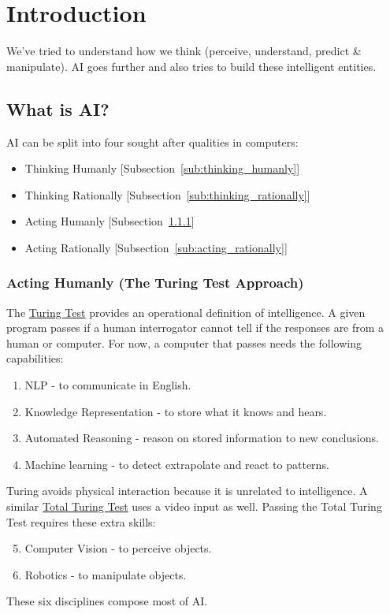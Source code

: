 \chapter{Introduction} %
\label{cha:introduction}

We've tried to understand how we think (perceive, understand, predict \&
manipulate). AI goes further and also tries to build these intelligent entities.

\section{What is AI?} %
\label{sec:what_is_ai_}
AI can be split into four sought after qualities in computers:
\begin{itemize}
    \item Thinking Humanly [Subsection~\ref{sub:thinking_humanly}]
    \item Thinking Rationally [Subsection~\ref{sub:thinking_rationally}]
    \item Acting Humanly [Subsection~\ref{sub:acting_humanly}]
    \item Acting Rationally [Subsection~\ref{sub:acting_rationally}]
\end{itemize}

\subsection{Acting Humanly (The Turing Test Approach)} %
\label{sub:acting_humanly}
The \uline{Turing Test} provides an operational definition of intelligence.
A given program passes if a human interrogator cannot tell if the responses are
from a human or computer.
For now, a computer that passes needs the following capabilities:
\begin{enumerate}
    \item NLP - to communicate in English.
    \item Knowledge Representation - to store what it knows and hears.
    \item Automated Reasoning - reason on stored information to new conclusions.
    \item Machine learning - to detect extrapolate and react to patterns.
\end{enumerate}
Turing avoids physical interaction because it is unrelated to intelligence.
A similar \uline{Total Turing Test} uses a video input as well.
Passing the Total Turing Test requires these extra skills:
\begin{enumerate}
    \setcounter{enumi}{4}
    \item Computer Vision - to perceive objects.
    \item Robotics - to manipulate objects.
\end{enumerate}
These six disciplines compose most of AI.

